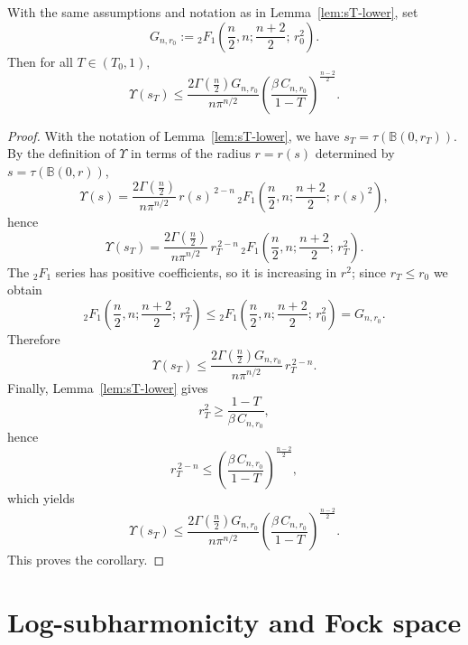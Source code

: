 \begin{numcor}\label{cor:Upsilon-sT}
With the same assumptions and notation as in Lemma~\ref{lem:sT-lower}, set
\[
G_{n,r_0}:={}_2F_1\!\left(\frac n2,n;\frac{n+2}{2};\,r_0^2\right).
\]
Then for all $T\in(T_0,1)$,
\[
\Upsilon(s_T)\le
\frac{2\Gamma\!\left(\frac n2\right) G_{n,r_0}}{n\pi^{n/2}}
\left(\frac{\beta\,C_{n,r_0}}{1-T}\right)^{\!\frac{n-2}{2}}.
\]
\end{numcor}

\begin{proof}
With the notation of Lemma~\ref{lem:sT-lower}, we have $s_T=\tau(\mathbb B(0,r_T))$.
By the definition of $\Upsilon$ in terms of the radius $r=r(s)$ determined by
$s=\tau(\mathbb B(0,r))$,
\[
\Upsilon(s)=\frac{2\Gamma\!\left(\frac n2\right)}{n\pi^{n/2}}\,
r(s)^{\,2-n}\,
{}_2F_1\!\left(\frac n2,n;\frac{n+2}{2};\,r(s)^2\right),
\]
hence
\[
\Upsilon(s_T)=\frac{2\Gamma\!\left(\frac n2\right)}{n\pi^{n/2}}\,
r_T^{\,2-n}\,
{}_2F_1\!\left(\frac n2,n;\frac{n+2}{2};\,r_T^2\right).
\]
The ${}_2F_1$ series has positive coefficients, so it is increasing in $r^2$; since
$r_T\le r_0$ we obtain
\[
{}_2F_1\!\left(\frac n2,n;\frac{n+2}{2};\,r_T^2\right)
\le {}_2F_1\!\left(\frac n2,n;\frac{n+2}{2};\,r_0^2\right)
=G_{n,r_0}.
\]
Therefore
\[
\Upsilon(s_T)\le
\frac{2\Gamma\!\left(\frac n2\right) G_{n,r_0}}{n\pi^{n/2}}\,
r_T^{\,2-n}.
\]
Finally, Lemma~\ref{lem:sT-lower} gives
\[
r_T^2\ge \frac{1-T}{\beta\,C_{n,r_0}},
\]
hence
\[
r_T^{\,2-n}\le \left(\frac{\beta\,C_{n,r_0}}{1-T}\right)^{\frac{n-2}{2}},
\]
which yields
\[
\Upsilon(s_T)\le
\frac{2\Gamma\!\left(\frac n2\right) G_{n,r_0}}{n\pi^{n/2}}
\left(\frac{\beta\,C_{n,r_0}}{1-T}\right)^{\!\frac{n-2}{2}}.
\]
This proves the corollary.
\end{proof}












\section{Log-subharmonicity and Fock space}

